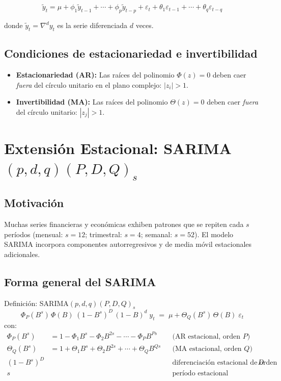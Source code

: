 \documentclass[12pt,a4paper]{article}
\begin{document}
\begin{equation}
  \tilde{y}_t = \mu + \phi_1\tilde{y}_{t-1} + \cdots + \phi_p\tilde{y}_{t-p}
               + \varepsilon_t + \theta_1\varepsilon_{t-1} + \cdots + \theta_q\varepsilon_{t-q}
  \label{eq:arima_exp}
\end{equation}

donde $\tilde{y}_t = \nabla^d y_t$ es la serie diferenciada $d$ veces.

\subsection{Condiciones de estacionariedad e invertibilidad}

\begin{itemize}
  \item \textbf{Estacionariedad (AR):} Las ra{\'i}ces del polinomio $\Phi(z)=0$ deben caer
        \emph{fuera} del c{\'i}rculo unitario en el plano complejo: $|z_i| > 1$.
  \item \textbf{Invertibilidad (MA):} Las ra{\'i}ces del polinomio $\Theta(z)=0$ deben caer
        \emph{fuera} del c{\'i}rculo unitario: $|z_j| > 1$.
\end{itemize}

\section{Extensi{\'o}n Estacional: SARIMA\texorpdfstring{$(p,d,q)(P,D,Q)_s$}{}}

\subsection{Motivaci{\'o}n}

Muchas series financieras y econ{\'o}micas exhiben patrones que se repiten cada $s$ per{\'i}odos
(mensual: $s=12$; trimestral: $s=4$; semanal: $s=52$). El modelo SARIMA incorpora
componentes autorregresivos y de media m{\'o}vil estacionales adicionales.

\subsection{Forma general del SARIMA}

\begin{defbox}{Definici{\'o}n: SARIMA$(p,d,q)(P,D,Q)_s$}
\[
  \boxed{
    \Phi_P(B^s)\,\Phi(B)\;(1-B^s)^D\,(1-B)^d\;y_t
    \;=\;
    \mu + \Theta_Q(B^s)\,\Theta(B)\;\varepsilon_t
  }
\]
con:
\begin{align*}
  \Phi_P(B^s) &= 1 - \Phi_1 B^s - \Phi_2 B^{2s} - \cdots - \Phi_P B^{Ps}
    & &\text{(AR estacional, orden }P\text{)}\\
  \Theta_Q(B^s) &= 1 + \Theta_1 B^s + \Theta_2 B^{2s} + \cdots + \Theta_Q B^{Qs}
    & &\text{(MA estacional, orden }Q\text{)}\\
  (1-B^s)^D &\; & &\text{diferenciaci{\'o}n estacional de orden }D\\
  s &\; & &\text{per{\'i}odo estacional}
\end{align*}
\end{defbox}
\end{document}

